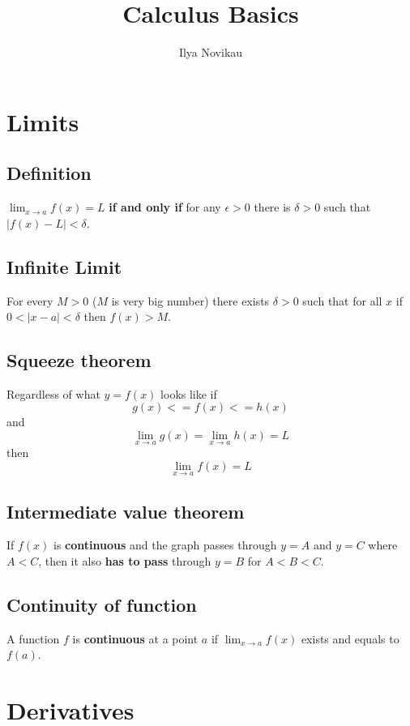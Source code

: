 \documentclass[12pt, a4paper]{scrartcl}
\author{Ilya Novikau}
\title{Calculus Basics}
\begin{document}
\maketitle

\tableofcontents

\newpage

\section{Limits}
\label{sec:limits}

\subsection{Definition}
\label{sec:limits:def}
$\lim_{x \to a}f(x) = L$ \textbf{if and only if} for any $\epsilon > 0$ there is $\delta > 0$ such that $|f(x) - L| < \delta$.

\subsection{Infinite Limit}
\label{sec:limits:inf_limit}
For every $M > 0$ ($M$ is very big number) there exists $\delta > 0$ such that for all $x$ if $0 < |x - a| < \delta$ then $f(x) > M$.

\subsection{Squeeze theorem}
\label{sec:limits:squeeze_theor}
Regardless of what $y = f(x)$ looks like if $$g(x) <= f(x) <= h(x)$$ and $$\lim_{x \to a}g(x)=\lim_{x \to a}h(x) = L$$ then $$\lim_{x \to a}f(x) = L$$

\subsection{Intermediate value theorem}
\label{sec:limits:ivt}
If $f(x)$ is \textbf{continuous} and the graph passes through $y = A$ and $y = C$ where $A < C$, then it also \textbf{has to pass} through $y = B$ for $A < B < C$.

\subsection{Continuity of function}
\label{sec:limits:continuity}
A function $f$ is \textbf{continuous} at a point $a$ if $\lim_{x \to a}f(x)$ exists and equals to $f(a)$.

\section{Derivatives}
\label{sec:derivatives}
\end{document}
